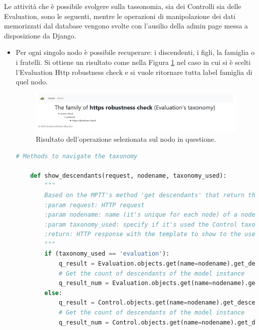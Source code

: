 %
Le attività che è possibile svolgere sulla tassonomia, sia dei Controlli sia delle Evaluation, sono le seguenti, mentre le operazioni 
di manipolazione dei dati memorizzati dal database vengono svolte con l'ausilio della admin page messa a disposizione da Django.\hfill\break
\begin{itemize}
    \item Per ogni singolo nodo è possibile recuperare: i discendenti, i figli, la famiglia o i fratelli. Si ottiene un risultato come nella
    Figura \ref{fig:MCRS_taxnodedetails} nel caso in cui si è scelti l'Evaluation Http robustness check e si vuole ritornare tutta label
    famiglia di quel nodo.
    \begin{figure}[ht!]
        \includegraphics[scale=0.3]{images/MCRS_taxnodedetails.png}
        \caption{Risultato dell'operazione selezionata sul nodo in questione.}
        \label{fig:MCRS_taxnodedetails}
    \end{figure}
    \lstset{style=python_code_style}
    \begin{lstlisting}[language=Python, label=lst:view_tax_nodedetails, caption={Codice utilizzato all'interno delle View per 
        implementare le operazioni per restituire i discendenti, i figli, la famiglia o i fratelli.}]
    # Methods to navigate the taxonomy
 
    def show_descendants(request, nodename, taxonomy_used):
        """
        Based on the MPTT's method 'get descendants' that return the descendants of a model instance, in tree order
        :param request: HTTP request
        :param nodename: name (it's unique for each node) of a node in the taxonomy
        :param taxonomy_used: specify if it's used the Control taxonomy or the Evaluation taxonomy
        :return: HTTP response with the template to show to the user
        """
        if (taxonomy_used == 'evaluation'):
            q_result = Evaluation.objects.get(name=nodename).get_descendants(include_self=False)
            # Get the count of descendants of the model instance
            q_result_num = Evaluation.objects.get(name=nodename).get_descendant_count()
        else:
            q_result = Control.objects.get(name=nodename).get_descendants(include_self=False)
            # Get the count of descendants of the model instance
            q_result_num = Control.objects.get(name=nodename).get_descendant_count()
 

\end{lstlisting}
\end{itemize}
